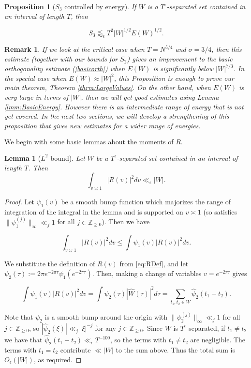 \documentclass{amsart}
\theoremstyle{plain}
\newtheorem{lmm}[thrm]{Lemma}
\newtheorem{prpstn}[thrm]{Proposition}
\newtheorem*{rmk}{Remark}
\numberwithin{equation}{section}
\begin{document}
\begin{prpstn}[\texorpdfstring{$S_3$}{S3} controlled by energy] \label{prpstnsimpleS3} If $W$ is a $T^\epsilon$-separated set contained in an interval of length $T$,  then

\[ S_3 \lessapprox_\epsilon T^2 |W|^{1/2} E(W)^{1/2}. \]

\end{prpstn}

%
%

\begin{rmk}  If we look at the critical case when $T = N^{5/4}$ and $\sigma = 3/4$, then this estimate (together with our bounds for $S_2$) gives an improvement to the basic orthogonality estimate (\ref{basicorth}) when $E(W)$ is significantly below $|W|^{7/3}$.  In the special case when $E(W) \approx |W|^2$, this Proposition is enough to prove our main theorem, Theorem \ref{thrm:LargeValues}.  On the other hand, when $E(W)$ is very large in terms of $|W|$, then we will get good estimates using Lemma \ref{lmm:BasicEnergy}.  However there is an intermediate range of energy that is not yet covered.  In the next two sections, we will develop a strengthening of this proposition that gives new estimates for a wider range of energies.  
\end{rmk}


We begin with some basic lemmas about the moments of $R$.

\begin{lmm}[$L^2$ bound] \label{RL2} Let $W$ be a $T^\epsilon$-separated set contained in an interval of length $T$. Then
\[ \int_{v \asymp 1} |R(v)|^2 dv \ll_\epsilon |W| .\]
\end{lmm}

%
%

\begin{proof} 
Let $\psi_1(v)$ be a smooth bump function which majorizes the range of integration of the integral in the lemma and is supported on $v\asymp 1$ (so satisfies $\|\psi_1^{(j)}\|_\infty \ll_j 1$ for all $j\in \mathbb{Z}_{\ge 0}$). Then we have

\[ \int_{v \asymp 1} |R(v)|^2 dv \le \int \psi_1(v) | R(v) |^2 dv.\]

We substitute the definition of $R(v)$ from \eqref{eq:RDef}, and let $\psi_2(\tau) :=2\pi e^{-2\pi\tau} \psi_1( e^{-2\pi\tau})$. Then, making a change of variables $v=e^{-2\pi \tau}$ gives

\[ \int \psi_1(v) | R(v) |^2 dv = \int  \psi_2(\tau) |  \widehat{W}(\tau)|^2 d \tau= \sum_{t_1, t_2 \in W} \widehat{\psi}_2(t_1 - t_2). \]

Note that $\psi_2$ is a smooth bump around the origin with $\|\psi_2^{(j)}\|_\infty\ll_j 1$ for all $j\in \mathbb{Z}_{\ge 0}$, so $|\widehat{\psi}_2(\xi)|\ll_j |\xi|^{-j}$ for any $j\in \mathbb{Z}_{\ge 0}$. Since $W$ is $T^\epsilon$-separated, if $t_1\ne t_2$ we have that $\widehat{\psi}_2(t_1-t_2)\ll_\epsilon T^{-100}$, so the terms with $t_1\ne t_2$ are negligible. The terms with $t_1=t_2$ contribute $\ll |W|$ to the sum above. Thus the total sum is $O_\epsilon(|W|)$, as required.
\end{proof}
\end{document}
